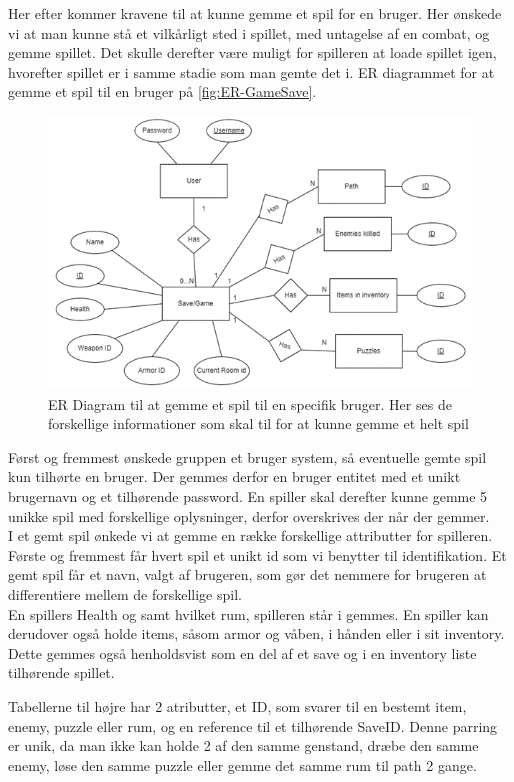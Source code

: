 \noindent Her efter kommer kravene til at kunne gemme et spil for en bruger. Her ønskede vi at man kunne stå et vilkårligt sted i spillet, med untagelse af en combat, og gemme spillet. Det skulle derefter være muligt for spilleren at loade spillet igen, hvorefter spillet er i samme stadie som man gemte det i.
ER diagrammet for at gemme et spil til en bruger på \autoref{fig:ER-GameSave}.
\begin{figure}[H]
\centering
\includegraphics[width = \textwidth]{02-Body/Images/ER-GameSave.PNG}
\caption{ER Diagram til at gemme et spil til en specifik bruger. Her ses de forskellige informationer som skal til for at kunne gemme et helt spil}
\label{fig:ER-GameSave}
\end{figure}

\noindent Først og fremmest ønskede gruppen et bruger system, så eventuelle gemte spil kun tilhørte en bruger.
Der gemmes derfor en bruger entitet med et unikt brugernavn og et tilhørende password.
En spiller skal derefter kunne gemme 5 unikke spil med forskellige oplysninger, derfor overskrives der når der gemmer.\\
I et gemt spil ønkede vi at gemme en række forskellige attributter for spilleren.
Første og fremmest får hvert spil et unikt id som vi benytter til identifikation.
Et gemt spil får et navn, valgt af brugeren, som gør det nemmere for brugeren at differentiere mellem de forskellige spil. \\ 
En spillers Health og samt hvilket rum, spilleren står i gemmes.
En spiller kan derudover også holde items, såsom armor og våben, i hånden eller i sit inventory. Dette gemmes også henholdsvist som en del af et save og i en inventory liste tilhørende spillet. 

\noindent Tabellerne til højre har 2 atributter, et ID, som svarer til en bestemt item, enemy, puzzle eller rum, og en reference til et tilhørende SaveID. 
Denne parring er unik, da man ikke kan holde 2 af den samme genstand, dræbe den samme enemy, løse den samme puzzle eller gemme det samme rum til path 2 gange.\\
